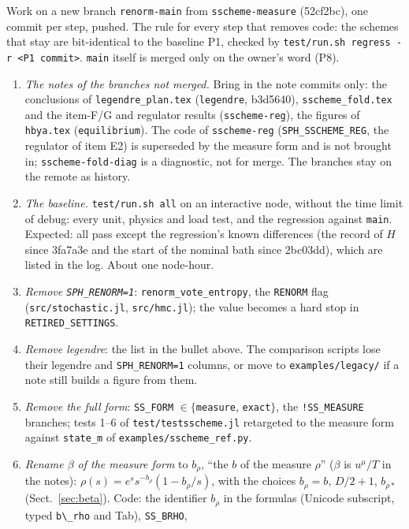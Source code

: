 \documentclass[11pt,aps,preprint,nofootinbib,superscriptaddress,tightenlines]{revtex4-2}
\def\Sect#1{Sect.~\ref{#1}}
\begin{document}
Work on a new branch \texttt{renorm-main} from \texttt{sscheme-measure} (52cf2bc), one commit per step, pushed.  The rule for every step that removes
code: the schemes that stay are bit-identical to the baseline P1, checked by \texttt{test/run.sh regress -r <P1 commit>}.  \texttt{main} itself is
merged only on the owner's word (P8).
\begin{enumerate}
\item[P0.] \emph{The notes of the branches not merged.}  Bring in the note commits only: the conclusions of \nolinkurl{legendre_plan.tex}
  (\texttt{legendre}, b3d5640), \nolinkurl{sscheme_fold.tex} and the item-F/G and regulator results (\texttt{sscheme-reg}), the figures of
  \nolinkurl{hbya.tex} (\texttt{equilibrium}).  The code of \texttt{sscheme-reg} (\texttt{SPH\_SSCHEME\_REG}, the regulator of item E2) is superseded
  by the measure form and is not brought in; \texttt{sscheme-fold-diag} is a diagnostic, not for merge.  The branches stay on the remote as history.
\item[P1.] \emph{The baseline.}  \texttt{test/run.sh all} on an interactive node, without the time limit of debug: every unit, physics and load test,
  and the regression against \texttt{main}.  Expected: all pass except the regression's known differences (the record of $H$ since 3fa7a3e and the
  start of the nominal bath since 2bc03dd), which are listed in the log.  About one node-hour.
\item[P2.] \emph{Remove \texttt{SPH\_RENORM=1}}: \texttt{renorm\_vote\_entropy}, the \texttt{RENORM} flag (\nolinkurl{src/stochastic.jl},
  \nolinkurl{src/hmc.jl}); the value becomes a hard stop in \texttt{RETIRED\_SETTINGS}.
\item[P3.] \emph{Remove legendre}: the list in the bullet above.  The comparison scripts lose their legendre and \texttt{SPH\_RENORM=1} columns, or
  move to \nolinkurl{examples/legacy/} if a note still builds a figure from them.
\item[P4.] \emph{Remove the full form}: \texttt{SS\_FORM} $\in\{$\texttt{measure}, \texttt{exact}$\}$, the \texttt{!SS\_MEASURE} branches; tests 1--6
  of \nolinkurl{test/testsscheme.jl} retargeted to the measure form against \texttt{state\_m} of \nolinkurl{examples/sscheme_ref.py}.
\item[P4b.] \emph{Rename $\beta$ of the measure form} to $b_\rho$, ``the $b$ of the measure $\rho$'' ($\beta$ is $u^\mu/T$ in the notes): $\rho(s)=e^s
  s^{-b_\rho}(1-b_\rho/s)$, with the choices $b_\rho=b$, $D/2+1$, $b_{\rho*}$ (\Sect{sec:beta}).  Code: the identifier $b_\rho$ in the formulas (Unicode subscript, typed \texttt{b\textbackslash\_rho} and Tab), \texttt{SS\_BRHO},

\end{enumerate}
\end{document}
